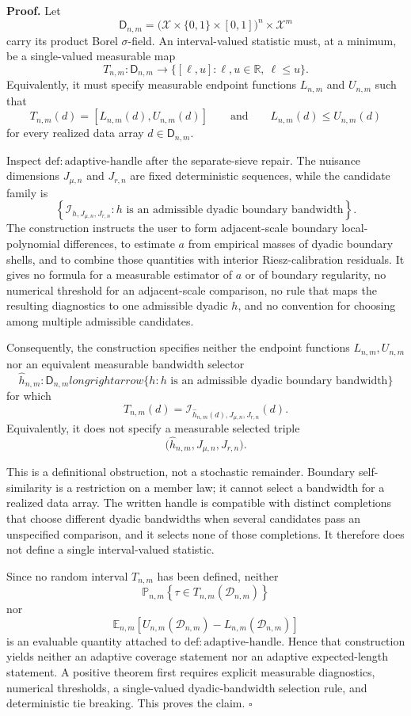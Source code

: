 \textbf{Proof.}
Let
\[
\mathsf D_{n,m}
=\bigl(\mathcal X\times\{0,1\}\times[0,1]\bigr)^n\times\mathcal X^m
\]
carry its product Borel \(\sigma\)-field.  An interval-valued statistic must, at a minimum, be a single-valued measurable map
\[
T_{n,m}:\mathsf D_{n,m}\longrightarrow
\bigl\{[\ell,u]:\ell,u\in\mathbb R,\ \ell\le u\bigr\}.
\]
Equivalently, it must specify measurable endpoint functions \(L_{n,m}\) and \(U_{n,m}\) such that
\[
T_{n,m}(d)=[L_{n,m}(d),U_{n,m}(d)]
\qquad\text{and}\qquad
L_{n,m}(d)\le U_{n,m}(d)
\]
for every realized data array \(d\in\mathsf D_{n,m}\).

Inspect \(\mathrm{def:adaptive\text{-}handle}\) after the separate-sieve repair.  The nuisance dimensions \(J_{\mu,n}\) and \(J_{r,n}\) are fixed deterministic sequences, while the candidate family is
\[
\left\{\mathcal I_{h,J_{\mu,n},J_{r,n}}:
h\text{ is an admissible dyadic boundary bandwidth}\right\}.
\]
The construction instructs the user to form adjacent-scale boundary local-polynomial differences, to estimate \(a\) from empirical masses of dyadic boundary shells, and to combine those quantities with interior Riesz-calibration residuals.  It gives no formula for a measurable estimator of \(a\) or of boundary regularity, no numerical threshold for an adjacent-scale comparison, no rule that maps the resulting diagnostics to one admissible dyadic \(h\), and no convention for choosing among multiple admissible candidates.

Consequently, the construction specifies neither the endpoint functions \(L_{n,m},U_{n,m}\) nor an equivalent measurable bandwidth selector
\[
\widehat h_{n,m}:\mathsf D_{n,m}longrightarrow
\{h:h\text{ is an admissible dyadic boundary bandwidth}\}
\]
for which
\[
T_{n,m}(d)
=\mathcal I_{\widehat h_{n,m}(d),J_{\mu,n},J_{r,n}}(d).
\]
Equivalently, it does not specify a measurable selected triple
\[
\bigl(\widehat h_{n,m},J_{\mu,n},J_{r,n}\bigr).
\]

This is a definitional obstruction, not a stochastic remainder.  Boundary self-similarity is a restriction on a member law; it cannot select a bandwidth for a realized data array.  The written handle is compatible with distinct completions that choose different dyadic bandwidths when several candidates pass an unspecified comparison, and it selects none of those completions.  It therefore does not define a single interval-valued statistic.

Since no random interval \(T_{n,m}\) has been defined, neither
\[
\mathbb P_{n,m}\!\left\{\tau\in T_{n,m}(\mathcal D_{n,m})\right\}
\]
nor
\[
\mathbb E_{n,m}\!\left[
U_{n,m}(\mathcal D_{n,m})-L_{n,m}(\mathcal D_{n,m})
\right]
\]
is an evaluable quantity attached to \(\mathrm{def:adaptive\text{-}handle}\).  Hence that construction yields neither an adaptive coverage statement nor an adaptive expected-length statement.  A positive theorem first requires explicit measurable diagnostics, numerical thresholds, a single-valued dyadic-bandwidth selection rule, and deterministic tie breaking.  This proves the claim. \(\square\)
